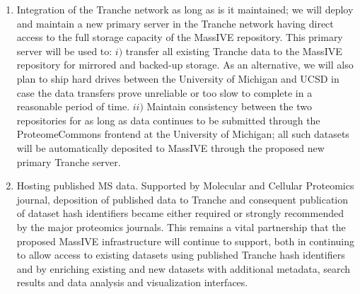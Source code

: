 \documentclass[arial,11pt]{article}
\begin{document}
\begin{enumerate}
\item Integration of the Tranche network as long as is it maintained; we will deploy and maintain a new primary server in the Tranche network having direct access to the full storage capacity of the MassIVE repository. This primary server will be used to: $i)$ transfer all existing Tranche data to the MassIVE repository for mirrored and backed-up storage. As an alternative, we will also plan to ship hard drives between the University of Michigan and UCSD in case the data transfers prove unreliable or too slow to complete in a reasonable period of time. $ii)$ Maintain consistency between the two repositories for as long as data continues to be submitted through the ProteomeCommons frontend at the University of Michigan; all such datasets will be automatically deposited to MassIVE through the proposed new primary Tranche server.

%
\item Hosting published MS  data. Supported by Molecular and Cellular Proteomics journal, deposition of published data to Tranche and consequent publication of dataset hash identifiers became either required or strongly recommended by the major proteomics journals. This remains a vital partnership that the proposed MassIVE infrastructure will continue to support, both in continuing to allow access to existing datasets using published Tranche hash identifiers and by enriching existing and new datasets with additional metadata, search results and data analysis and visualization interfaces.
\end{enumerate}
\end{document}
